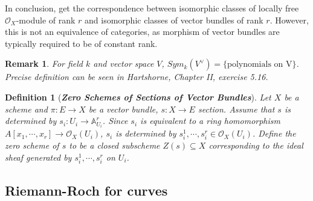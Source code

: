 \documentclass{ctexart}
\newtheorem{definition}{Definition}[section]
\newtheorem{remark}{Remark}[section]
\begin{document}
In conclusion, get the correspondence between isomorphic classes of locally free $\mathcal{O}_{X}$-module of rank $r$ and isomorphic classes of vector bundles of rank $r$.
However, this is not an equivalence of categories, as morphism of vector bundles are typically required to be of constant rank.
\begin{remark}
    For field $k$ and vector space $V$, $Sym_{k}(V^{\lor}) = \{\text{polynomials on V}\}$.
    Precise definition can be seen in Hartshorne, Chapter II, exercise 5.16.
\end{remark}
\begin{definition}[\textbf{\emph{Zero Schemes of Sections of Vector Bundles}}]
    Let $X$ be a scheme and $\pi: E \longrightarrow X$ be a vector bundle, $s: X \longrightarrow E$ section.
    Assume that $s$ is determined by $s_{i}: U_{i} \longrightarrow \mathbb{A}_{U_{i}}^{r}$.
    Since $s_{i}$ is equivalent to a ring homomorphism $A[x_{1}, \cdots, x_{r}] \longrightarrow \mathcal{O}_{X}(U_{i})$, $s_{i}$ is determined by $s_{i}^{1}, \cdots, s_{i}^{r}\in \mathcal{O}_{X}(U_{i})$.
    Define the zero scheme of $s$ to be a closed subscheme $Z(s) \subseteq X$ corresponding to the ideal sheaf generated by $s_{i}^{1}, \cdots, s_{i}^{r}$ on $U_{i}$.
\end{definition}

\subsection{Riemann-Roch for curves}
\label{subsection:Divisors_Riemann-Roch_for_curves}
\end{document}
